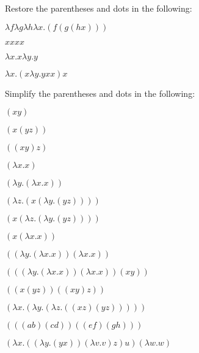 \documentclass[10pt,a4paper]{exam}
\begin{document}


\vspace{10pt}

% 

\vspace{90pt}

\begin{questions}

\question[20] Restore the parentheses and dots in the following:

\begin{parts}
\item $\lambda f \lambda g \lambda h \lambda x.(f(g(h x)))$
\item $xxxx$  
\item $\lambda x.x\lambda y.y$ 
\item $\lambda x.(x\lambda y.yxx)x$ 
\end{parts}

\question[20] Simplify the parentheses and dots in the following:

\begin{parts}
\item $(xy)$ 
\item $(x(yz))$ 
\item $((xy)z)$
\item $(\lambda x.x)$
\item $(\lambda y.(\lambda x.x))$
\item $(\lambda z.(x(\lambda y.(yz))))$
\item $(x(\lambda z.(\lambda y.(yz))))$
\item $(x(\lambda x.x))$
\item $((\lambda y.(\lambda x.x))(\lambda x.x))$
\item $(((\lambda y.(\lambda x.x))(\lambda x.x))(xy))$
\item $((x(yz))((xy)z))$
\item $(\lambda x.(\lambda y.(\lambda z.((xz)(yz)))))$
\item $(((ab)(cd))((ef)(gh)))$
\item $(\lambda x.((\lambda y.(yx))(\lambda v.v)z)u)(\lambda w.w)$
\end{parts}


\end{questions}
\end{document}
